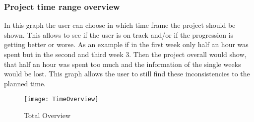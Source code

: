 \subsubsection{Project time range overview}
In this graph the user can choose in which time frame the project should be shown. This allows to see if the user is on track and/or if the progression is getting better or worse. As an example if in the first week only half an hour was spent but in the second and third week 3. Then the project overall would show, that half an hour was spent too much and the information of the single weeks would be lost. This graph allows the user to still find these inconsistencies to the planned time.
\begin{figure}[H]
	\centering
	\texttt{[image: TimeOverview]}
	\caption{Total Overview}
	\label{figure11}
\end{figure}